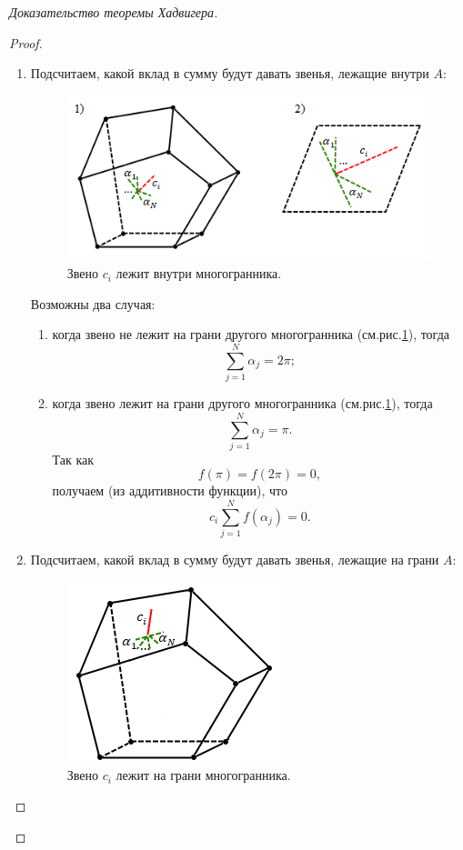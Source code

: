 \begin{proof}[Доказательство теоремы Хадвигера]
\begin{proof}
    \begin{enumerate}
        \item Подсчитаем, какой вклад в сумму будут давать звенья, лежащие внутри $A$:
        \begin{figure}[htbp]
            \centering
            \includegraphics[scale=0.7]{images/c8.6.png}
            \caption{Звено $c_i$ лежит внутри многогранника.}
            \label{fig:c8.6}
        \end{figure}
        Возможны два случая:
        \begin{enumerate}
            \item когда звено не лежит на грани другого многогранника (см.рис.\ref{fig:c8.6}), тогда \[\sum_{j = 1}^{N} \alpha_j = 2 \pi;\]
            \item когда звено лежит на грани другого многогранника (см.рис.\ref{fig:c8.6}), тогда \[\sum_{j = 1}^{N} \alpha_j = \pi.\]
            Так как \[f(\pi) = f(2 \pi) = 0,\]
            получаем (из аддитивности функции), что
            \[c_i \sum_{j = 1}^{N} f(\alpha_j) = 0.\]
        \end{enumerate}
        \item Подсчитаем, какой вклад в сумму будут давать звенья, лежащие на грани $A$:
        \begin{figure}[htbp]
            \centering
            \includegraphics[scale=0.7]{images/c8.7.png}
            \caption{Звено $c_i$ лежит на грани многогранника.}

\end{figure}
\end{enumerate}
\end{proof}
\end{proof}
